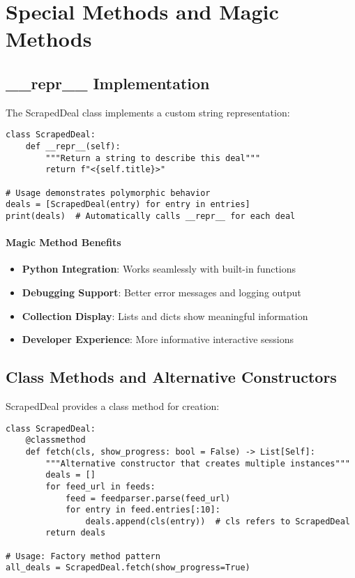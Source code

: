 \section{Special Methods and Magic Methods}

\subsection{\_\_repr\_\_ Implementation}

The ScrapedDeal class implements a custom string representation:

\begin{lstlisting}[caption=Custom \_\_repr\_\_ Implementation]
class ScrapedDeal:
    def __repr__(self):
        """Return a string to describe this deal"""
        return f"<{self.title}>"
        
# Usage demonstrates polymorphic behavior
deals = [ScrapedDeal(entry) for entry in entries]
print(deals)  # Automatically calls __repr__ for each deal
\end{lstlisting}

\paragraph{Magic Method Benefits}
\begin{itemize}
\item \textbf{Python Integration}: Works seamlessly with built-in functions
\item \textbf{Debugging Support}: Better error messages and logging output
\item \textbf{Collection Display}: Lists and dicts show meaningful information
\item \textbf{Developer Experience}: More informative interactive sessions
\end{itemize}

\subsection{Class Methods and Alternative Constructors}

ScrapedDeal provides a class method for creation:

\begin{lstlisting}[caption=Class Method as Alternative Constructor]
class ScrapedDeal:
    @classmethod
    def fetch(cls, show_progress: bool = False) -> List[Self]:
        """Alternative constructor that creates multiple instances"""
        deals = []
        for feed_url in feeds:
            feed = feedparser.parse(feed_url)
            for entry in feed.entries[:10]:
                deals.append(cls(entry))  # cls refers to ScrapedDeal
        return deals

# Usage: Factory method pattern
all_deals = ScrapedDeal.fetch(show_progress=True)
\end{lstlisting}

